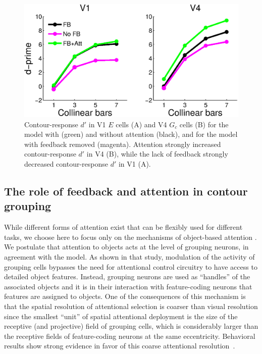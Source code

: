 \begin{figure}[t]
\centering
\includegraphics[width=\textwidth]{Contour/figs/Fig5.eps}
\makeatletter
\let\@currsize\normalsize
\caption[Model prediction of the effect of feedback and attention on contour-response d-prime]{Contour-response $d'$ in V1 $E$ cells (A) and V4 $G_c$ cells (B) for the model with (green) and without attention (black), and for the model with feedback removed (magenta). Attention strongly increased
contour-response $d'$ in V4 (B), while the lack of feedback strongly
decreased contour-response $d'$ in V1 (A).}
\label{Fig:FB_att}
\end{figure}

\subsection{The role of feedback and attention in contour grouping}   
\label{sec:feedback}
While different forms of attention exist that can be flexibly used for
different tasks, we choose here to focus only on the mechanisms of
object-based attention \citep{Egly_etal94,Scholl01,Kimchi_etal07,Ho_Yeh09}. We postulate that attention to objects acts at the level of grouping neurons, in
agreement with the \cite{Mihalas_etal11b} model.  As shown in that
study, modulation of the activity of grouping cells bypasses the need
for attentional control circuitry to have access to detailed object
features.  Instead, grouping neurons are used as ``handles'' of the
associated objects and it is in their interaction with feature-coding
neurons that features are assigned to objects. One of the consequences
of this mechanism is that the spatial resolution of attentional
selection is coarser than visual resolution since the smallest ``unit'' of spatial attentional deployment is the size of the receptive (and projective) field of grouping cells, which is considerably larger than the receptive fields of feature-coding neurons at the same eccentricity. Behavioral results show strong evidence in favor of this coarse attentional resolution~\citep{Intriligator_Cavanagh01}.

